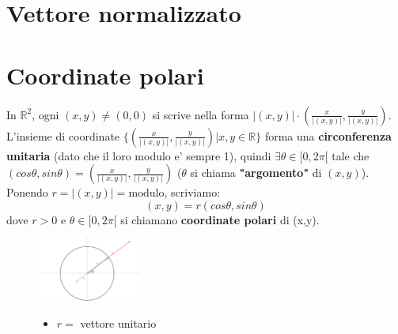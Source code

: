 \documentclass{report}
\begin{document}
\section{Vettore normalizzato}
\section{Coordinate polari}
In $ \mathbb{R}^2 $, ogni $ (x,y)\neq(0,0) $ si scrive nella forma $ |(x,y)|\cdot (\frac{x}{|(x,y)|}, \frac{y}{|(x,y)|}) $. L'insieme di coordinate $ \{(\frac{x}{|(x,y)|}, \frac{y}{|(x,y)|})|x,y\in\mathbb{R}\} $ forma una \textbf{circonferenza unitaria} (dato che il loro modulo e' sempre 1), quindi $ \exists \theta \in [0,2\pi[ $ tale che $ (cos\theta, sin\theta) = (\frac{x}{|(x,y)|}, \frac{y}{|(x,y)|}) $ ($ \theta $ si chiama \textbf{"argomento"} di $ (x,y) $). Ponendo $ r = |(x,y)| = \text{modulo} $, scriviamo:
\[ (x,y) = r(cos\theta, sin\theta) \]
dove $ r > 0 $ e $ \theta \in [0,2\pi[ $ si chiamano \textbf{coordinate polari} di (x,y).

\begin{figure}[h!]
    \centering
    \includegraphics[width=0.3\textwidth]{img/2024-03-15-10-51-45.png}
    \begin{itemize}
    \item $ r =  $ vettore unitario
    \end{itemize}
\end{figure}
\end{document}

